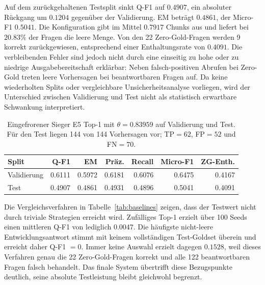 \documentclass[11pt]{article}
\begin{document}
Auf dem zurückgehaltenen Testsplit sinkt Q-F1 auf $0.4907$, ein absoluter Rückgang um $0.1204$ gegenüber der Validierung. EM beträgt $0.4861$, der Micro-F1 $0.5041$. Die Konfiguration gibt im Mittel $0.7917$ Chunks aus und liefert bei $20.83\%$ der Fragen die leere Menge. Von den 22 Zero-Gold-Fragen werden 9 korrekt zurückgewiesen, entsprechend einer Enthaltungsrate von $0.4091$. Die verbleibenden Fehler sind jedoch nicht durch eine einseitig zu hohe oder zu niedrige Ausgabebereitschaft erklärbar: Neben falsch-positiven Abrufen bei Zero-Gold treten leere Vorhersagen bei beantwortbaren Fragen auf. Da keine wiederholten Splits oder vergleichbare Unsicherheitsanalyse vorliegen, wird der Unterschied zwischen Validierung und Test nicht als statistisch erwartbare Schwankung interpretiert.

\begin{table}[t]
\centering
\small
\begin{tabular}{lrrrrrr}
\toprule
\textbf{Split} & \textbf{Q-F1} & \textbf{EM} & \textbf{Präz.} & \textbf{Recall} & \textbf{Micro-F1} & \textbf{ZG-Enth.} \\
\midrule
Validierung & 0.6111 & 0.5972 & 0.6181 & 0.6076 & 0.6475 & 0.4167 \\
Test         & 0.4907 & 0.4861 & 0.4931 & 0.4896 & 0.5041 & 0.4091 \\
\bottomrule
\end{tabular}
\caption{Eingefrorener Sieger E5 Top-1 mit $\theta=0.83959$ auf Validierung und Test. Für den Test liegen 144 von 144 Vorhersagen vor; TP${}=62$, FP${}=52$ und FN${}=70$.}
\label{tab:final-system}
\end{table}

Die Vergleichsverfahren in Tabelle~\ref{tab:baselines} zeigen, dass der Testwert nicht durch triviale Strategien erreicht wird. Zufälliges Top-1 erzielt über 100 Seeds einen mittleren Q-F1 von lediglich $0.0047$. Die häufigste nicht-leere Entwicklungsantwort stimmt mit keinem vollständigen Test-Goldset überein und erreicht daher Q-F1 $=0$. Immer keine Auswahl erzielt dagegen $0.1528$, weil dieses Verfahren genau die 22 Zero-Gold-Fragen korrekt und alle 122 beantwortbaren Fragen falsch behandelt. Das finale System übertrifft diese Bezugspunkte deutlich, seine absolute Testleistung bleibt gleichwohl begrenzt.
\end{document}
